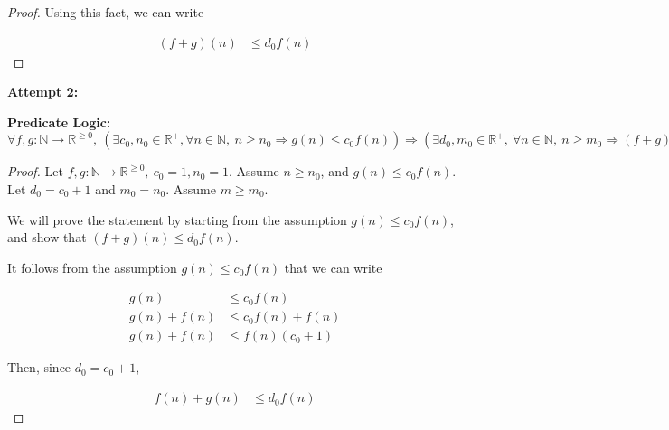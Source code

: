 \documentclass[12pt]{article}
\begin{document}
\begin{itemize}
\begin{proof}
        Using this fact, we can write

        \begin{align}
            (f + g)(n) &\leq d_0f(n)
        \end{align}
    \end{proof}

    \bigskip

    \begin{mdframed}
        \underline{\textbf{Attempt 2:}}

        \bigskip

        \color{red}
        \textbf{Predicate Logic:} $\forall f,g:\mathbb{N} \to \mathbb{R}^{\geq 0},\:
        (\exists c_0,n_0 \in \mathbb{R}^{+}, \forall n \in \mathbb{N}, \:n \geq
        n_0 \Rightarrow g(n) \leq c_0f(n)) \Rightarrow (\exists d_0,m_0 \in
        \mathbb{R}^{+},\:\forall n \in \mathbb{N},\:n \geq m_0 \Rightarrow (f + g)(n)
        \leq d_0f(n))$
        \color{black}

        \bigskip

        \begin{proof}
            Let $f,g: \mathbb{N} \to \mathbb{R}^{\geq 0},\:c_0 = 1, n_0 = 1$. Assume $n \geq n_0$,
            and $g(n) \leq c_0f(n)$. Let $d_0 = c_0 + 1$ and $m_0 = n_0$. Assume $m \geq m_0$.

            \bigskip

            We will prove the statement by starting from the assumption $g(n) \leq c_0f(n)$,
            and show that $(f + g)(n) \leq d_0f(n)$.

            \bigskip

            It follows from the assumption $g(n) \leq c_0f(n)$ that we can write

            \setcounter{equation}{0}
            \begin{align}
                g(n) &\leq c_0f(n)\\
                g(n) + f(n) &\leq c_0f(n) + f(n)\\
                g(n) + f(n) &\leq f(n)(c_0 + 1)
            \end{align}

            \bigskip

            Then, since $d_0 = c_0 + 1$,

            \begin{align}
                f(n) + g(n) &\leq d_0f(n)
            \end{align}

            \bigskip


\end{proof}
\end{mdframed}
\end{itemize}
\end{document}
